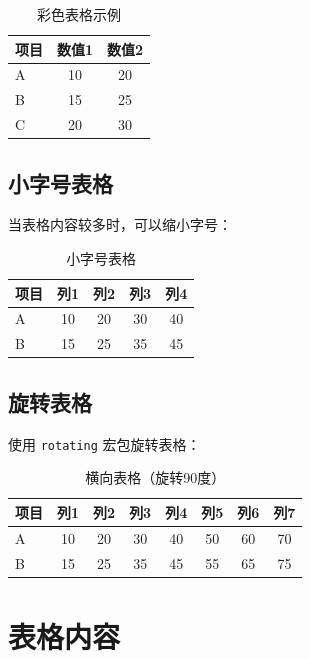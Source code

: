 \begin{table}[htbp]
  \centering
  \caption{彩色表格示例}
  \begin{tabular}{lcc}
    \toprule
    \rowcolor{gray!30}
    项目 & 数值1 & 数值2 \\
    \midrule
    A & 10 & 20 \\
    \rowcolor{gray!10}
    B & 15 & 25 \\
    C & 20 & 30 \\
    \bottomrule
  \end{tabular}
\end{table}

\subsection{小字号表格}

当表格内容较多时，可以缩小字号：

\begin{table}[htbp]
  \centering
  \caption{小字号表格}
  \small  %
  \begin{tabular}{lcccc}
    \toprule
    项目 & 列1 & 列2 & 列3 & 列4 \\
    \midrule
    A & 10 & 20 & 30 & 40 \\
    B & 15 & 25 & 35 & 45 \\
    \bottomrule
  \end{tabular}
\end{table}

\subsection{旋转表格}

使用 \texttt{rotating} 宏包旋转表格：

\begin{table}
  \centering
  \caption{横向表格（旋转90度）}
  \begin{tabular}{lccccccc}
    \toprule
    项目 & 列1 & 列2 & 列3 & 列4 & 列5 & 列6 & 列7 \\
    \midrule
    A & 10 & 20 & 30 & 40 & 50 & 60 & 70 \\
    B & 15 & 25 & 35 & 45 & 55 & 65 & 75 \\
    \bottomrule
  \end{tabular}
\end{table}

\section{表格内容}

